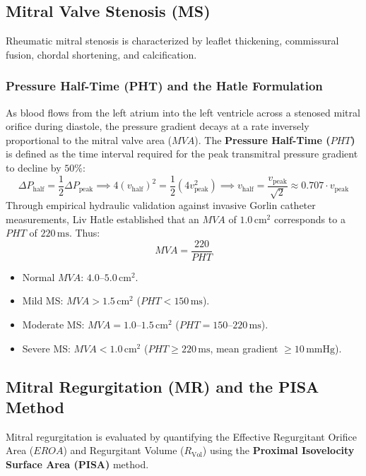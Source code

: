 \documentclass[11pt,a4paper]{article}
\begin{document}
\subsection{Mitral Valve Stenosis (MS)}

Rheumatic mitral stenosis is characterized by leaflet thickening, commissural fusion, chordal shortening, and calcification.

\subsubsection{Pressure Half-Time (PHT) and the Hatle Formulation}
As blood flows from the left atrium into the left ventricle across a stenosed mitral orifice during diastole, the pressure gradient decays at a rate inversely proportional to the mitral valve area ($MVA$). The \textbf{Pressure Half-Time ($PHT$)} is defined as the time interval required for the peak transmitral pressure gradient to decline by $50\%$:
\begin{equation}
    \Delta P_{\text{half}} = \frac{1}{2} \Delta P_{\text{peak}} \implies 4 (v_{\text{half}})^2 = \frac{1}{2} \left( 4 v_{\text{peak}}^2 \right) \implies v_{\text{half}} = \frac{v_{\text{peak}}}{\sqrt{2}} \approx 0.707 \cdot v_{\text{peak}}
\end{equation}
Through empirical hydraulic validation against invasive Gorlin catheter measurements, Liv Hatle established that an $MVA$ of $1.0\,\text{cm}^2$ corresponds to a $PHT$ of $220\,\text{ms}$. Thus:
\begin{equation}
    MVA = \frac{220}{PHT}
\end{equation}
\begin{itemize}[leftmargin=*]
    \item Normal $MVA$: $4.0\text{--}5.0\,\text{cm}^2$.
    \item Mild MS: $MVA > 1.5\,\text{cm}^2$ ($PHT < 150\,\text{ms}$).
    \item Moderate MS: $MVA = 1.0\text{--}1.5\,\text{cm}^2$ ($PHT = 150\text{--}220\,\text{ms}$).
    \item Severe MS: $MVA < 1.0\,\text{cm}^2$ ($PHT \ge 220\,\text{ms}$, mean gradient $\ge 10\,\text{mmHg}$).
\end{itemize}

\subsection{Mitral Regurgitation (MR) and the PISA Method}

Mitral regurgitation is evaluated by quantifying the Effective Regurgitant Orifice Area ($EROA$) and Regurgitant Volume ($R_{\text{Vol}}$) using the \textbf{Proximal Isovelocity Surface Area (PISA)} method.
\end{document}
